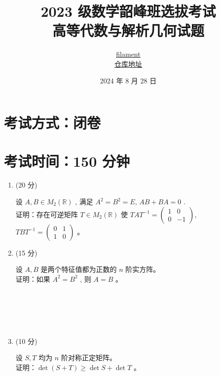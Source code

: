 \documentclass{article}
\title{ \textbf{2023 级数学韶峰班选拔考试 \\ 高等代数与解析几何试题} }
\author{ \href{https://github.com/Unconnectable}{filament} \\ \href{https://github.com/Unconnectable/XTU_MATH}{仓库地址}}
\date{2024 年 8 月 28 日}
\begin{document}
\maketitle

\section*{考试方式：闭卷}
\section*{考试时间：150 分钟}

\begin{enumerate}
    \item (20 分) 
    \begin{tcolorbox}[colframe=blue!50!black, colback=blue!5!white]
    设 $A, B \in M_{2}(\mathbb{R})$ , 满足 $A^{2}=B^{2}=E$, $A B+B A=0$ .\\
    证明：存在可逆矩阵 $T \in M_{2}(\mathbb{R})$ 使 $T A T^{-1}=\left(\begin{array}{cc}1 & 0 \\ 0 & -1\end{array}\right)$, $T B T^{-1}=\left(\begin{array}{cc}0 & 1 \\ 1 & 0\end{array}\right)$ 。
    \end{tcolorbox} 

    \item (15 分) 
    \begin{tcolorbox}[colframe=green!50!black, colback=green!5!white]
    设 $A, B$ 是两个特征值都为正数的 $n$ 阶实方阵。\\
    证明：如果 $A^{2}=B^{2}$ , 则 $A=B$ 。
    \end{tcolorbox} \\\\\\\\
    
    \item (10 分) 
    \begin{tcolorbox}[colframe=red!50!black, colback=red!5!white]
    设 $S, T$ 均为 $n$ 阶对称正定矩阵。\\
    证明：$\operatorname{det}(S+T) \geq \operatorname{det} S+\operatorname{det} T$ 。
    \end{tcolorbox} \\\\\\\\
    

\end{enumerate}
\end{document}
